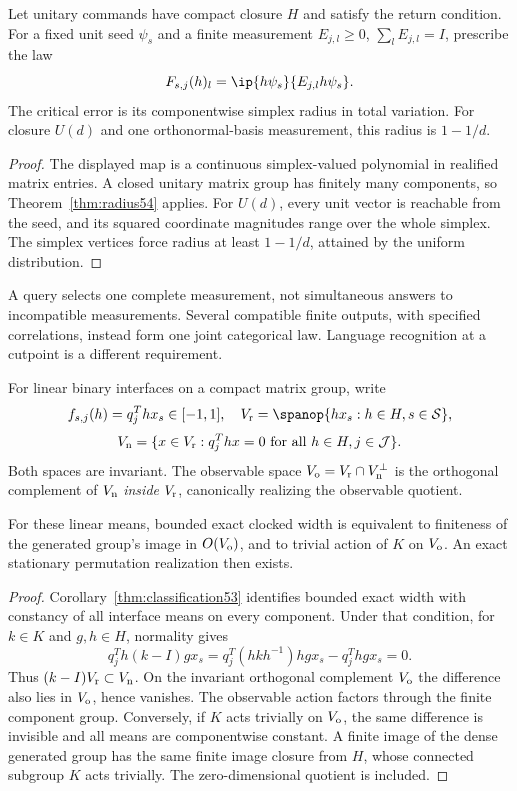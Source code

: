 \begin{corollary}\label{cor:quantum54}
Let unitary commands have compact closure $H$ and satisfy the return condition. For a fixed unit seed $\psi_s$ and a finite measurement $E_{j,l}\ge0$, $\sum_lE_{j,l}=I$, prescribe the law
\[
 F_{s,j}(h)_l=\ip{h\psi_s}{E_{j,l}h\psi_s}.
\]
The critical error is its componentwise simplex radius in total variation. For closure $U(d)$ and one orthonormal-basis measurement, this radius is $1-1/d$.
\end{corollary}
\begin{proof}
The displayed map is a continuous simplex-valued polynomial in realified matrix entries. A closed unitary matrix group has finitely many components, so Theorem~\ref{thm:radius54} applies. For $U(d)$, every unit vector is reachable from the seed, and its squared coordinate magnitudes range over the whole simplex. The simplex vertices force radius at least $1-1/d$, attained by the uniform distribution.
\end{proof}
A query selects one complete measurement, not simultaneous answers to incompatible measurements. Several compatible finite outputs, with specified correlations, instead form one joint categorical law. Language recognition at a cutpoint is a different requirement.

For linear binary interfaces on a compact matrix group, write
\[
 f_{s,j}(h)=q_j^Thx_s\in[-1,1],\quad
 V_{\rm r}=\spanop\{hx_s:h\in H,s\in\mathcal S\},
\]
\[
 V_{\rm n}=\{x\in V_{\rm r}:q_j^Thx=0\text{ for all }h\in H,j\in\mathcal J\}.
\]
Both spaces are invariant. The observable space $V_{\rm o}=V_{\rm r}\cap V_{\rm n}^\perp$ is the orthogonal complement of $V_{\rm n}$ \emph{inside} $V_{\rm r}$, canonically realizing the observable quotient.

\begin{theorem}\label{thm:observable53}
For these linear means, bounded exact clocked width is equivalent to finiteness of the generated group's image in $O(V_{\rm o})$, and to trivial action of $K$ on $V_{\rm o}$. An exact stationary permutation realization then exists.
\end{theorem}
\begin{proof}
Corollary~\ref{thm:classification53} identifies bounded exact width with constancy of all interface means on every component. Under that condition, for $k\in K$ and $g,h\in H$, normality gives
\[
 q_j^Th(k-I)gx_s=q_j^T(hkh^{-1})hgx_s-q_j^Thgx_s=0.
\]
Thus $(k-I)V_{\rm r}\subset V_{\rm n}$. On the invariant orthogonal complement $V_{\rm o}$ the difference also lies in $V_{\rm o}$, hence vanishes. The observable action factors through the finite component group. Conversely, if $K$ acts trivially on $V_{\rm o}$, the same difference is invisible and all means are componentwise constant. A finite image of the dense generated group has the same finite image closure from $H$, whose connected subgroup $K$ acts trivially. The zero-dimensional quotient is included.
\end{proof}

